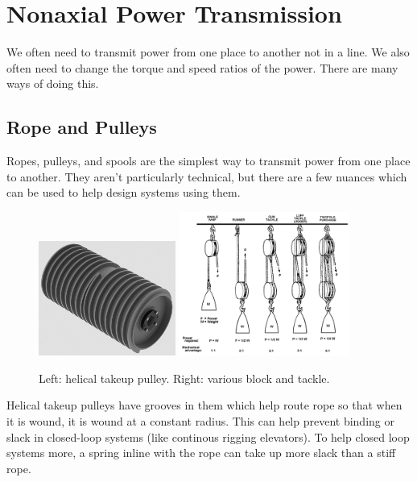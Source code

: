 \documentclass[10pt,letterpaper]{book}
\begin{document}
\section{Nonaxial Power Transmission}

We often need to transmit power from one place to another not in a line. We also often need to change the torque and speed ratios of the power. There are many ways of doing this.

\subsection{Rope and Pulleys}

Ropes, pulleys, and spools are the simplest way to transmit power from one place to another. They aren't particularly technical, but there are a few nuances which can be used to help design systems using them.

\begin{figure}[H]	
	\includegraphics[width=0.4\textwidth]{imgs/takeup_pulley.png}
	\includegraphics[width=0.5\textwidth]{imgs/block_tackle.png}
	\caption{Left: helical takeup pulley. Right: various block and tackle.}
\end{figure}

Helical takeup pulleys have grooves in them which help route rope so that when it is wound, it is wound at a constant radius. This can help prevent binding or slack in closed-loop systems (like continous rigging elevators). To help closed loop systems more, a spring inline with the rope can take up more slack than a stiff rope.
\end{document}
